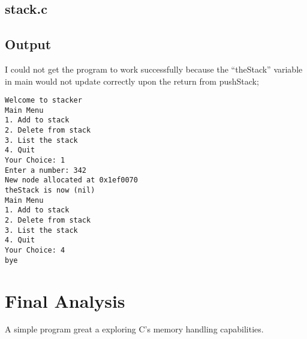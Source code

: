 \documentclass[letterpaper,oneside]{scrartcl}
\begin{document}
\subsection{stack.c}

\subsection{Output}
I could not get the program to work successfully because the ``theStack'' variable in main
would not update correctly upon the return from pushStack;

\begin{Verbatim}
Welcome to stacker
Main Menu
1. Add to stack
2. Delete from stack
3. List the stack
4. Quit
Your Choice: 1
Enter a number: 342
New node allocated at 0x1ef0070
theStack is now (nil)
Main Menu
1. Add to stack
2. Delete from stack
3. List the stack
4. Quit
Your Choice: 4
bye
\end{Verbatim}

\section{Final Analysis}

A simple program great a exploring C's memory handling capabilities.
\end{document}

